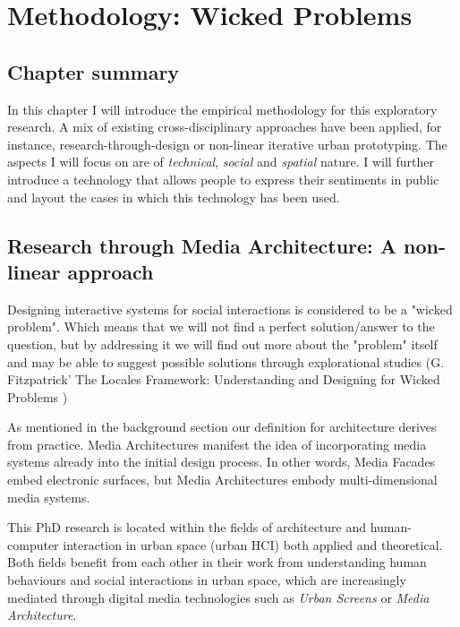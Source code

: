 \textit{}\chapter{Methodology: Wicked Problems}
\label{chapterlabel5}

\section*{Chapter summary}

In this chapter I will introduce the empirical methodology for this exploratory research. A mix of existing cross-disciplinary approaches have been applied, for instance, research-through-design or non-linear iterative urban prototyping. The aspects I will focus on are of \textit{technical}, \textit{social} and \textit{spatial} nature.  I will further introduce a technology that allows people to express their sentiments in public and layout the cases in which this technology has been used.  \newpage


\section{Research through Media Architecture: A non-linear approach}


Designing interactive systems for social interactions is considered to be a "wicked problem". Which means that we will not find a perfect solution/answer to the question, but by addressing it we will find out more about the "problem" itself and may be able to suggest possible solutions through explorational studies (G. Fitzpatrick' The Locales Framework: Understanding and Designing for Wicked Problems )

As mentioned in the background section our definition for architecture derives from practice. Media Architectures manifest the idea of incorporating media systems already into the initial design process. In other words, Media Facades embed electronic surfaces, but Media Architectures embody multi-dimensional media systems. 

This PhD research is located within the fields of architecture and human-computer interaction in urban space (urban HCI) both applied and theoretical. 
Both fields benefit from each other in their work from understanding human behaviours and social interactions in urban space, which are increasingly mediated through digital media technologies such as \textit{Urban Screens} or \textit{Media Architecture}.

